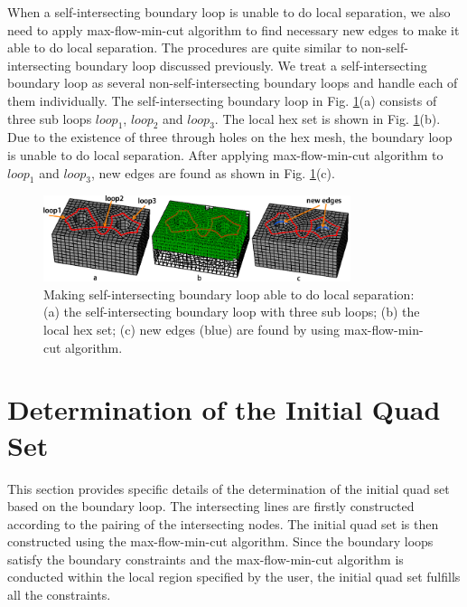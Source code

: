 \documentclass[final,5p,times,twocolumn]{elsarticle}
\begin{document}
When a self-intersecting boundary loop is unable to do local separation, we also need to apply max-flow-min-cut algorithm to find necessary new edges to make it able to do local separation. The procedures are quite similar to non-self-intersecting boundary loop discussed previously. We treat a self-intersecting boundary loop as several non-self-intersecting boundary loops and handle each of them individually. The self-intersecting boundary loop in Fig. \ref{fig:int_loop_local_sep}(a) consists of three sub loops $loop_1$, $loop_2$ and $loop_3$. The local hex set is shown in Fig. \ref{fig:int_loop_local_sep}(b). Due to the existence of three through holes on the hex mesh, the boundary loop is unable to do local separation. After applying max-flow-min-cut algorithm to $loop_1$ and $loop_3$, new edges are found as shown in Fig. \ref{fig:int_loop_local_sep}(c).

\begin{figure}[htbp]
\begin{center}
\includegraphics[width=9cm]{int_loop_local_sep.png}
\caption{Making self-intersecting boundary loop able to do local separation: (a) the self-intersecting boundary loop with three sub loops; (b) the local hex set; (c) new edges (blue) are found by using max-flow-min-cut algorithm.}
\label{fig:int_loop_local_sep}
\end{center}
\end{figure}

\section{Determination of the Initial Quad Set}
\label{sec:det_quad_set}
This section provides specific details of the determination of the initial quad set based on the boundary loop. The intersecting lines are firstly constructed according to the pairing of the intersecting nodes. The initial quad set is then constructed using the max-flow-min-cut algorithm. Since the boundary loops satisfy the boundary constraints and the max-flow-min-cut algorithm is conducted within the local region specified by the user, the initial quad set fulfills all the constraints.
\end{document}
